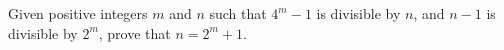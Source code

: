 \problem{}
Given positive integers $m$ and $n$ such that $4^m - 1$ is divisible by $n$, and $n - 1$ is divisible by $2^m$, prove that $n = 2^m + 1$.

\solution

\endproblem
